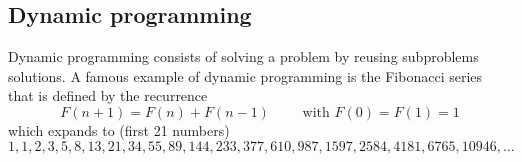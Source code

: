 

\newpage
\subsection{Dynamic programming} \label{intro_dp}
Dynamic programming consists of solving a problem by reusing subproblems solutions. A famous example of dynamic programming is the Fibonacci series that is defined by the recurrence
\[F(n+1) = F(n)+F(n-1) \qquad \text{ with } F(0)=F(1)=1 \]
which expands to (first 21 numbers)
\[1, 1, 2, 3, 5, 8, 13, 21, 34, 55, 89, 144, 233, 377, 610, 987, 1597, 2584, 4181, 6765, 10946, ...\]

